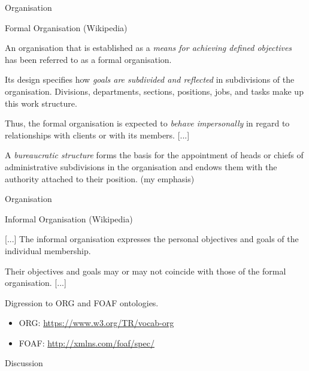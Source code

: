 \documentclass{beamer}
\begin{document}
\begin{frame}{Organisation}

  \begin{block}{Formal Organisation (Wikipedia)}
    
    An organisation that is established as a \emph{means for achieving defined
      objectives} has been referred to as a formal organisation.\medskip

    Its design specifies how \emph{goals are subdivided and reflected} in
    subdivisions of the organisation. Divisions, departments, sections,
    positions, jobs, and tasks make up this work structure.\medskip

    Thus, the formal organisation is expected to \emph{behave impersonally} in
    regard to relationships with clients or with its members. [...]\medskip

    A \emph{bureaucratic structure} forms the basis for the appointment of
    heads or chiefs of administrative subdivisions in the organisation and
    endows them with the authority attached to their position.  (my emphasis)
  \end{block}
\end{frame}


\begin{frame}{Organisation}
  \begin{block}{Informal Organisation (Wikipedia)}
   
    [...] The informal organisation expresses the personal objectives and
    goals of the individual membership.

    Their objectives and goals may or may not coincide with those of the
    formal organisation. [...]
  \end{block}

  Digression to ORG and FOAF ontologies.
  \begin{itemize}
  \item ORG: \url{https://www.w3.org/TR/vocab-org}
  \item FOAF: \url{http://xmlns.com/foaf/spec/}
  \end{itemize}

  \begin{center}\Large Discussion  \end{center}
  
\end{frame}
\end{document}
